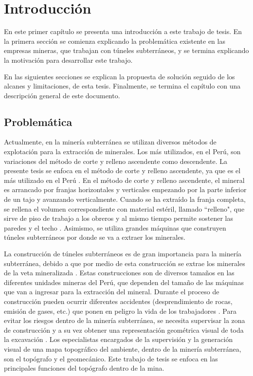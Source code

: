 \chapter{Introducción}

En este primer capítulo se presenta una introducción a este trabajo de 
tesis. En la primera sección se comienza explicando la problemática existente 
en las empresas mineras, que trabajan con túneles subterráneos, y se termina 
explicando la motivación para desarrollar este trabajo. 

En las siguientes secciones se explican la propuesta de solución seguido de los alcanes 
y limitaciones, de esta tesis. Finalmente, se termina el capítulo con una descripción 
general de este documento.

\section{Problemática}

Actualmente, en la minería subterránea se utilizan diversos métodos de explotación para la 
extracción de minerales. Los más utilizados, en el Perú, son variaciones del método de 
corte y relleno ascendente como descendente. La presente tesis se enfoca en el método 
de corte y relleno ascendente, ya que es el más utilizado en el Perú \cite{Cruz2012}. En 
el método de corte y relleno ascendente, el mineral es arrancado por franjas horizontales 
y verticales empezando por la parte inferior de un tajo y avanzando verticalmente. Cuando 
se ha extraído la franja completa, se rellena el volumen correspondiente con material 
estéril, llamado ``relleno", que sirve de piso de trabajo a los obreros y al mismo tiempo permite 
sostener las paredes y el techo \cite{MunozDelPino2012}. Asimismo, se utiliza grandes 
máquinas que construyen túneles subterráneos por donde se va a extraer los minerales. 

La construcción de túneles subterráneos es de gran importancia para la minería subterránea, 
debido a que por medio de esta construcción se extrae los minerales de la veta mineralizada 
\cite{EtapaTunelSubterraneo}. Estas construcciones son de diversos tamaños en las diferentes 
unidades mineras del Perú, que dependen del tamaño de las máquinas que van a ingresar para la 
extracción del mineral. Durante el proceso de construcción pueden ocurrir diferentes accidentes 
(desprendimiento de rocas, emisión de gases, etc.) que ponen en peligro la vida de los 
trabajadores \cite{GasesMinero}. Para evitar los riesgos dentro de la minería subterránea, se 
necesita supervisar la zona de construcción y a su vez obtener una representación geométrica 
visual de toda la excavación \cite{SeguridadMinera}. Los especialistas encargados de la supervisión 
y la generación visual de una mapa topográfico del ambiente, dentro de la minería subterránea, son 
el topógrafo y el geomecánico. Este trabajo de tesis se enfoca en las principales funciones del 
topógrafo dentro de la mina. 

